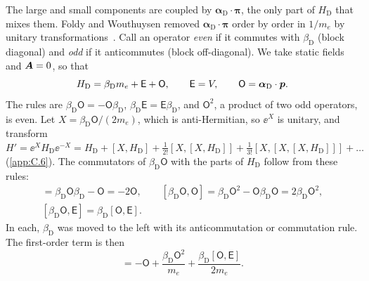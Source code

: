 The large and small components are coupled by $\boldsymbol{\alpha}_{\mathrm{D}}\cdot\boldsymbol{\pi}$, the only part of $H_{\mathrm{D}}$ that mixes them. Foldy and Wouthuysen removed $\boldsymbol{\alpha}_{\mathrm{D}}\cdot\boldsymbol{\pi}$ order by order in $1/m_e$ by unitary transformations~\cite{foldy1950dirac}. Call an operator \emph{even} if it commutes with $\beta_{\mathrm{D}}$ (block diagonal) and \emph{odd} if it anticommutes (block off-diagonal). We take static fields and $\bm{A} = 0$, so that
\begin{equation}
  H_{\mathrm{D}} = \beta_{\mathrm{D}}m_e + \mathsf{E} + \mathsf{O}, \qquad \mathsf{E} = V, \qquad \mathsf{O} = \boldsymbol{\alpha}_{\mathrm{D}}\cdot\bm{p} .
  \label{eq:C.15-split}
\end{equation}
The rules are $\beta_{\mathrm{D}}\mathsf{O} = -\mathsf{O}\beta_{\mathrm{D}}$, $\beta_{\mathrm{D}}\mathsf{E} = \mathsf{E}\beta_{\mathrm{D}}$, and $\mathsf{O}^2$, a product of two odd operators, is even. Let $X = \beta_{\mathrm{D}}\mathsf{O}/(2m_e)$, which is anti-Hermitian, so $\ee^{X}$ is unitary, and transform $H' = \ee^{X}H_{\mathrm{D}}\ee^{-X} = H_{\mathrm{D}} + [X, H_{\mathrm{D}}] + \tfrac{1}{2!}[X,[X,H_{\mathrm{D}}]] + \tfrac{1}{3!}[X,[X,[X,H_{\mathrm{D}}]]] + \dots$ (\cref{app:C.6}). The commutators of $\beta_{\mathrm{D}}\mathsf{O}$ with the parts of $H_{\mathrm{D}}$ follow from these rules:
\begin{gather*}
  [\beta_{\mathrm{D}}\mathsf{O}, \beta_{\mathrm{D}}] = \beta_{\mathrm{D}}\mathsf{O}\beta_{\mathrm{D}} - \mathsf{O} = -2\mathsf{O}, \qquad
  [\beta_{\mathrm{D}}\mathsf{O}, \mathsf{O}] = \beta_{\mathrm{D}}\mathsf{O}^2 - \mathsf{O}\beta_{\mathrm{D}}\mathsf{O} = 2\beta_{\mathrm{D}}\mathsf{O}^2,\\
  [\beta_{\mathrm{D}}\mathsf{O}, \mathsf{E}] = \beta_{\mathrm{D}}[\mathsf{O}, \mathsf{E}] .
\end{gather*}
In each, $\beta_{\mathrm{D}}$ was moved to the left with its anticommutation or commutation rule. The first-order term is then
\begin{equation*}
  [X, H_{\mathrm{D}}] = -\mathsf{O} + \frac{\beta_{\mathrm{D}}\mathsf{O}^2}{m_e} + \frac{\beta_{\mathrm{D}}[\mathsf{O}, \mathsf{E}]}{2m_e} .
\end{equation*}
